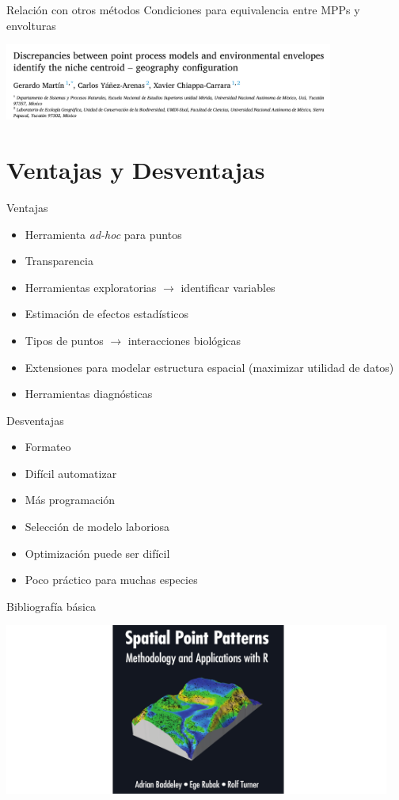 \documentclass[
  11pt,
  ignorenonframetext,
]{beamer}
\providecommand{\tightlist}{%
  \setlength{\itemsep}{0pt}\setlength{\parskip}{0pt}}
\begin{document}
\begin{frame}{Relación con otros métodos}
\protect\hypertarget{relaciuxf3n-con-otros-muxe9todos-1}{}
Condiciones para equivalencia entre MPPs y envolturas

\includegraphics[width=4.26in]{Figuras/Discrep}
\end{frame}

\hypertarget{ventajas-y-desventajas}{%
\section{Ventajas y Desventajas}\label{ventajas-y-desventajas}}

\begin{frame}{Ventajas}
\protect\hypertarget{ventajas}{}
\begin{itemize}
\tightlist
\item
  Herramienta \emph{ad-hoc} para puntos
\item
  Transparencia
\item
  Herramientas exploratorias \(\rightarrow\) identificar variables
\item
  Estimación de efectos estadísticos
\item
  Tipos de puntos \(\rightarrow\) interacciones biológicas
\item
  Extensiones para modelar estructura espacial (maximizar utilidad de
  datos)
\item
  Herramientas diagnósticas
\end{itemize}
\end{frame}

\begin{frame}{Desventajas}
\protect\hypertarget{desventajas}{}
\begin{itemize}
\tightlist
\item
  Formateo
\item
  Difícil automatizar
\item
  Más programación
\item
  Selección de modelo laboriosa
\item
  Optimización puede ser difícil
\item
  Poco práctico para muchas especies
\end{itemize}
\end{frame}

\begin{frame}{Bibliografía básica}
\protect\hypertarget{bibliografuxeda-buxe1sica}{}
\begin{center}\includegraphics[width=5in]{Figuras/Spat-book} \end{center}
\end{frame}
\end{document}
